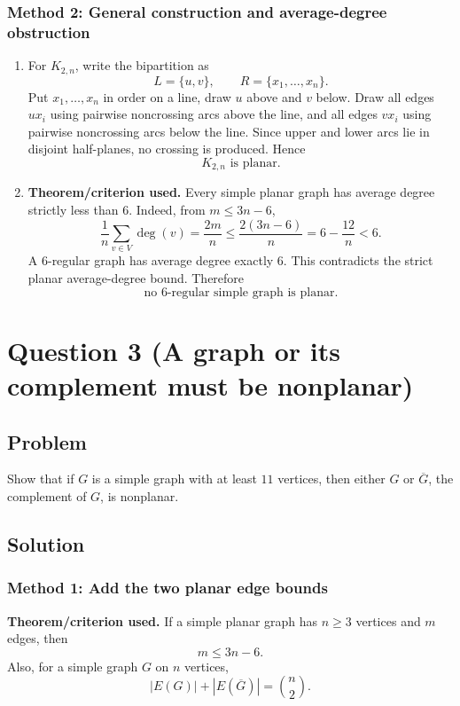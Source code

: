 \documentclass[12pt]{article}
\newcommand{\comp}[1]{\overline{#1}}
\begin{document}
\subsubsection{Method 2: General construction and average-degree obstruction}
\begin{enumerate}[label=(\alph*)]
  \item For $K_{2,n}$, write the bipartition as
  \[
    L=\{u,v\},
    \qquad
    R=\{x_1,\dots,x_n\}.
  \]
  Put $x_1,\dots,x_n$ in order on a line, draw $u$ above and $v$ below. Draw all edges $ux_i$ using pairwise noncrossing arcs above the line, and all edges $vx_i$ using pairwise noncrossing arcs below the line. Since upper and lower arcs lie in disjoint half-planes, no crossing is produced. Hence
  \[
    \boxed{K_{2,n}\text{ is planar}.}
  \]

  \item \textbf{Theorem/criterion used.} Every simple planar graph has average degree strictly less than $6$. Indeed, from $m\le 3n-6$,
  \[
    \frac{1}{n}\sum_{v\in V}\deg(v)=\frac{2m}{n}\le \frac{2(3n-6)}{n}=6-\frac{12}{n}<6.
  \]
  A $6$-regular graph has average degree exactly $6$. This contradicts the strict planar average-degree bound. Therefore
  \[
    \boxed{\text{no }6\text{-regular simple graph is planar}.}
  \]
\end{enumerate}

\newpage
\section{Question 3 (A graph or its complement must be nonplanar)}

\subsection{Problem}
Show that if $G$ is a simple graph with at least $11$ vertices, then either $G$ or $\comp{G}$, the complement of $G$, is nonplanar.

\subsection{Solution}

\subsubsection{Method 1: Add the two planar edge bounds}
\textbf{Theorem/criterion used.} If a simple planar graph has $n\ge 3$ vertices and $m$ edges, then
\[
  m\le 3n-6.
\]
Also, for a simple graph $G$ on $n$ vertices,
\[
  |E(G)|+|E(\comp{G})|=\binom{n}{2}.
\]
\end{document}
